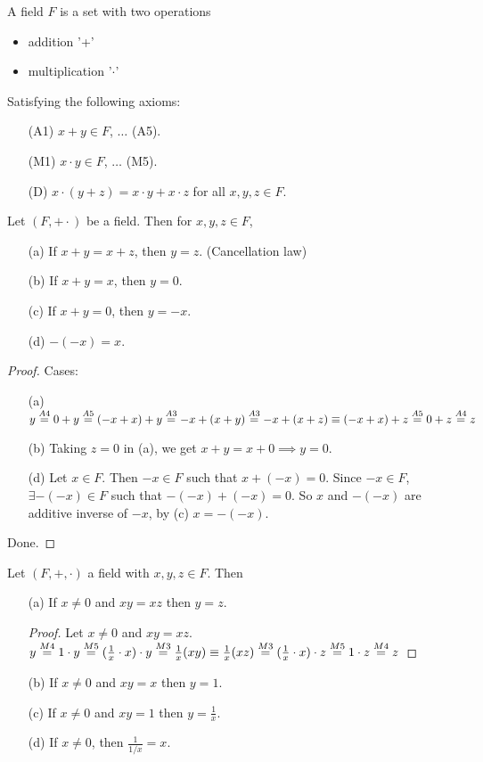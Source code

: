 \documentclass[]{article}
\begin{document}
\begin{definition}
	[Field] A field $F$ is a set with two operations
	\begin{itemize}
		\item addition '+'
		\item multiplication '$\cdot$'
	\end{itemize}
	Satisfying the following axioms:
	\begin{enumerate}
		\item[(A1)] $x+y \in F$, $\dots$ (A5).
		\item[(M1)] $x\cdot y \in F$, $\dots$ (M5).
		\item[(D)] $x\cdot(y+z) = x\cdot y + x\cdot z$ for all $x,y,z\in F$.
	\end{enumerate}
\end{definition}

\begin{proposition}
	\label{prop1.14}
	Let $(F,+\cdot)$ be a field. Then for $x,y,z\in F$,
	\begin{enumerate}
		\item[(a)] If $x+y = x+z$, then $y = z$. (Cancellation law)
		\item[(b)] If $x+y = x$, then $y = 0$.
		\item[(c)] If $x+y = 0$, then $y = -x$.
		\item[(d)] $-(-x)=x$.
	\end{enumerate}
\end{proposition}
\begin{proof}
	Cases:
	\begin{enumerate}
		\item[(a)] $y \overset{A4}{=} 0+y \overset{A5}{=} (-x+x) + y \overset{A3}{=} -x+(x+y) \overset{A3}{=} -x+(x+z)\equiv (-x+x)+z \overset{A5}{=} 0+z \overset{A4}{=} z$
		\item[(b)] Taking $z=0$ in (a), we get $x+y = x+0 \implies y=0$.
		\item[(d)] Let $x\in F$. Then $-x\in F$ such that $x+(-x)=0$. Since $-x\in F$, $\exists -(-x)\in F$ such that $-(-x)+(-x)=0$. So $x$ and $-(-x)$ are additive inverse of $-x$, by (c) $x=-(-x)$.
	\end{enumerate}
Done.
\end{proof}

\begin{proposition}
	Let $(F,+,\cdot)$ a field with $x,y,z\in F$. Then
	\begin{enumerate}
		\item[(a)] If $x\neq 0$ and $xy=xz$ then $y=z$.
		\begin{proof}
			Let $x\neq 0$ and $xy = xz$. $y \overset{M4}{=} 1\cdot y \overset{M5}{=} (\frac{1}{x}\cdot x)\cdot y \overset{M3}{=} \frac{1}{x}(xy) \equiv \frac{1}{x}(xz) \overset{M3}{=} (\frac{1}{x}\cdot x)\cdot z \overset{M5}{=} 1\cdot z \overset{M4}{=} z$
		\end{proof}
		\item[(b)] If $x\neq 0$ and $xy=x$ then $y=1$.
		\item[(c)] If $x\neq 0$ and $xy = 1$ then $y=\frac{1}{x}$.
		\item[(d)] If $x\neq 0$, then $\frac{1}{1/x} = x$.
	\end{enumerate}
\end{proposition}
\end{document}
